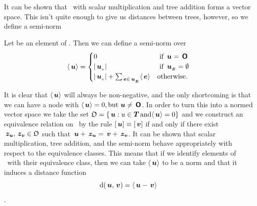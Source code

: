 
It can be shown that \TDOM\ with scalar multiplication and tree addition forms a vector space. This
isn't quite enough to give us distances between trees, however, so we define a semi-norm
\begin{definition}
  \label{defnabs}
  Let  be an element of \TDOM. Then we can define a semi-norm over \TDOM
  \begin{align*}
    \langle{\,\boldsymbol{u}}\rangle = \begin{cases}
      0 & \text{ if } \,\boldsymbol{u} = \,\boldsymbol{\mathsf{O}} \\
      \lvert{{\,\boldsymbol{u}}_{{}_{v}}}\rvert & \text{ if }{\,\boldsymbol{u}}_{{}_{\boldsymbol{E}}} = \emptyset \\
      \lvert{{\,\boldsymbol{u}}_{{}_{v}}}\rvert + \sum_{\,\boldsymbol{e}\in{\,\boldsymbol{u}}_{{}_{\boldsymbol{E}}}}\langle{\,\boldsymbol{e}}\rangle & \text{otherwise.}
    \end{cases}
  \end{align*}
\end{definition}


It is clear that $\langle{\,\boldsymbol{u}}\rangle$ will always be non-negative, and the only shortcoming is that we
can have a node  with $\langle{\,\boldsymbol{u}}\rangle = 0, \operatorname{\text{but}} \,\boldsymbol{u} \neq \,\boldsymbol{\mathsf{O}}$.  In order to turn
this into a normed vector space we take the set $\mathfrak{O} = \{\,\boldsymbol{u}: u \in \boldsymbol{T} \operatorname{\text{and}}
  \langle{\,\boldsymbol{u}}\rangle = 0\}$ and we construct an equivalence relation on \TDOM\ by the rule $[\,\boldsymbol{u}]
\equiv [\,\boldsymbol{v}]$ if and only if there exist $\,\boldsymbol{z_u}, \,\boldsymbol{z_v} \in \mathfrak{O}$ such that
$\,\boldsymbol{u} + \,\boldsymbol{z_u} = \,\boldsymbol{v} + \,\boldsymbol{z_v}$.  It can be shown that scalar multiplication,
tree addition,  and the semi-norm behave appropriately with
respect to the equivalence classes. This means that if we identify
elements of \TDOM\ with their equivalence class, then we can take $\langle{\,\boldsymbol{u}}\rangle$ to be a norm and
that it induces a distance function \[\operatorname{d}(\,\boldsymbol{u},\,\boldsymbol{v}) = \langle{\,\boldsymbol{u} - \,\boldsymbol{v}}\rangle\].



